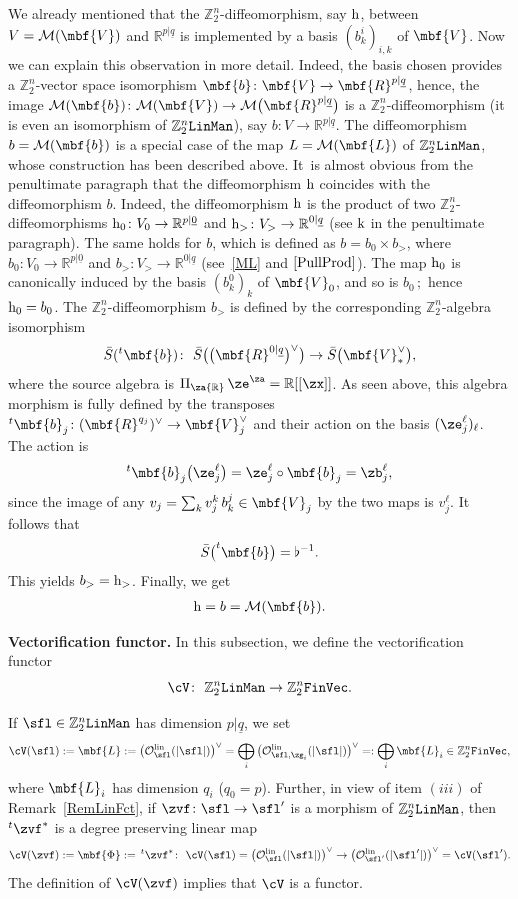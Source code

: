 \documentclass[10pt,a4paper]{amsart}
\newcommand{\rmh}{\textnormal{h}}
\newcommand{\rmk}{\textnormal{k}}
\newcommand{\op}[1]{\operatorname{#1}}
\newcommand{\R}{{\mathbb R}}
\newcommand{\Z}{{\mathbb Z}}
\def\ul{\underline}
\def\cM{\cal M}
\def\cO{\mathcal{O}}
\def\cM{\mathcal{M}}
\def\ul{\underline}
\newcommand{\0}{\otimes}
\newcommand{\z}{\Z_2^n}
\numberwithin{equation}{section}
\providecommand{\cal}{\mathcal}
\begin{document}
We already mentioned that the $\z$-diffeomorphism, say $\rmh$, between $V=\cM(\mbf{V})$ and $\R^{p|\ul q}$ is implemented by a basis $(b^i_k)_{i,k}$ of $\mbf{V}$. Now we can explain this observation in more detail. Indeed, the basis chosen provides a $\z$-vector space isomorphism $\mbf{b}\colon \mbf{V}\to\mbf{R}^{p|\ul q}$, hence, the image $\cM(\mbf{b})\colon \cM(\mbf{V})\to \cM\big(\mbf{R}^{p|\ul q}\big)$ is a $\z$-diffeomorphism (it is even an isomorphism of $\z{\tt LinMan}$), say $b\colon V\to \R^{p|\ul q}$. The diffeomorphism $b=\cM(\mbf{b})$ is a special case of the map $L=\cM(\mbf{L})$ of $\z{\tt LinMan}$, whose construction has been described above. It~is almost obvious from the penultimate paragraph that the diffeomorphism $\rmh$ coincides with the diffeomorphism $b$. Indeed, the diffeomorphism $\rmh$ is the product of two $\z$-diffeomorphisms $\rmh_0\colon V_0\to\R^{p|\ul 0}$ and $\rmh_>\colon V_>\to\R^{0|\ul q}$ (see $\rmk$ in the penultimate paragraph). The same holds for $b$, which is defined as $b=b_0\times b_>$, where $b_0\colon V_0\to\R^{p|\ul 0}$ and $b_>\colon V_>\to \R^{0|\ul q}$ (see~\eqref{ML} and $\eqref{PullProd}$). The map $\rmh_0$ is canonically induced by the basis $(b^0_k)_k$ of $\mbf{V}_0$, and so is $b_0\,;$ hence
$\rmh_0=b_0$. The $\z$-diffeomorphism $b_>$ is defined by the corresponding $\z$-algebra isomorphism
\[
\bar{S}(^t\mbf{b})\colon\ \bar{S}\big(\big(\mbf{R}^{0|\ul q}\big)^\vee\big)\to \bar{S}\big(\mbf{V}_*^\vee\big),
\]
where the source algebra is $\Pi_\za\R\,\ze^\za=\R[[\zx]]$. As seen above, this algebra morphism is fully defined by the transposes $^t\mbf{b}_j\colon (\mbf{R}^{q_j})^\vee\to\mbf{V}_j^\vee$ and their action on the basis $(\ze^\ell_j)_\ell$. The action is
\[
^t\mbf{b}_j\big(\ze_j^\ell\big)=\ze_j^\ell\circ \mbf{b}_j=\zb_j^\ell,
\]
since the image of any $v_j=\sum_{k}v^k_j\, b_k^j\in\mbf{V}_j$ by the two maps is $v_j^\ell$. It follows that
\begin{gather}\label{GlobDiffcM1}
\bar{S}\big(^t\mbf{b}\big)=\flat^{-1}.
\end{gather}
This yields $b_>=\rmh_>$. Finally, we get
\begin{gather}\label{GlobDiffcM2}
\rmh=b=\cM(\mbf{b}).
\end{gather}

\noindent
{\bf Vectorification functor.} In this subsection, we define the vectorification functor
\[
\cV\colon\ \z{\tt LinMan}\to\z{\tt FinVec}.
\]


If $\sfl\in\z{\tt LinMan}$ has dimension $p|\ul q$, we set
\begin{gather}\label{DefVecFun}
\cV(\sfl):=\mbf{L}:=\big(\cO_\sfl^{\op{lin}}(|\sfl|)\big)^\vee =\bigoplus_i\big(\cO_{\sfl,\zg_i}^{\op{lin}}(|\sfl|)\big)^\vee=:\bigoplus_i\mbf{L}_i\in\z{\tt FinVec},
\end{gather}
where $\mbf{L}_i$ has dimension $q_i$ ($q_0=p$). Further, in view of item $(iii)$ of Remark~\ref{RemLinFct}, if $\zvf\colon \sfl\to\sfl'$ is a morphism of $\z\tt LinMan$, then $^t\zvf^*$ is a degree preserving linear map
\[
\cV(\zvf):=\mbf{\Phi}:=\,^t\zvf^*\colon\ \cV(\sfl) =\big(\cO_{\sfl}^{\op{lin}}(|\sfl|)\big)^\vee\to\big(\cO_{\sfl'}^{\op{lin}}(|\sfl'|)\big)^\vee =\cV(\sfl').
\]
The definition of $\cV(\zvf)$ implies that $\cV$ is a functor.
\end{document}
